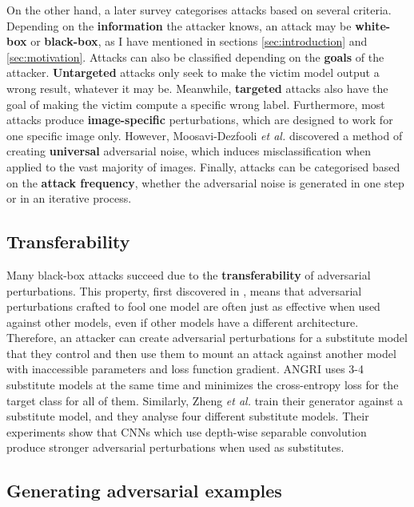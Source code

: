 On the other hand, a later survey \cite{silva_survey} categorises attacks based on several criteria. Depending on the \textbf{information} the attacker knows, an attack may be \textbf{white-box} or \textbf{black-box}, as I have mentioned in sections \ref{sec:introduction} and \ref{sec:motivation}. Attacks can also be classified depending on the \textbf{goals} of the attacker. \textbf{Untargeted} attacks only seek to make the victim model output a wrong result, whatever it may be. Meanwhile, \textbf{targeted} attacks also have the goal of making the victim compute a specific wrong label. Furthermore, most attacks produce \textbf{image-specific} perturbations, which are designed to work for one specific image only. However, Moosavi-Dezfooli \textit{et al.} \cite{Moosavi-Dezfooli_2017_CVPR} discovered a method of creating \textbf{universal} adversarial noise, which induces misclassification when applied to the vast majority of images. Finally, attacks can be categorised based on the \textbf{attack frequency}, whether the adversarial noise is generated in one step or in an iterative process.

\subsection{Transferability}

Many black-box attacks succeed due to the \textbf{transferability} of adversarial perturbations. This property, first discovered in \cite{szegedy2014intriguing}, means that adversarial perturbations crafted to fool one model are often just as effective when used against other models, even if other models have a different architecture. Therefore, an attacker can create adversarial perturbations for a substitute model that they control and then use them to mount an attack against another model with inaccessible parameters and loss function gradient. ANGRI \cite{upset_angri} uses 3-4 substitute models at the same time and minimizes the cross-entropy loss for the target class for all of them. Similarly, Zheng \textit{et al.} \cite{zheng_black_box_GAN} train their generator against a substitute model, and they analyse four different substitute models. Their experiments show that CNNs which use depth-wise separable convolution \cite{xception} produce stronger adversarial perturbations when used as substitutes.

\subsection{Generating adversarial examples}

